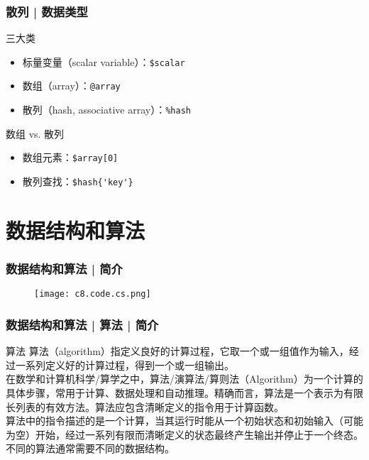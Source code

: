 \begin{frame}[fragile]
  \frametitle{散列 | \alert{数据类型}}
  \begin{block}{三大类}
    \begin{itemize}
      \item 标量变量（scalar variable）：\verb|$scalar|
      \item 数组（array）：\verb|@array|
      \item 散列（hash, associative array）：\verb|%hash|
    \end{itemize}
  \end{block}
  \pause
  \begin{block}{数组 vs. 散列}
    \begin{itemize}
      \item 数组元素：\verb|$array[0]|
      \item 散列查找：\verb|$hash{'key'}|
    \end{itemize}
  \end{block}
\end{frame}

\section{数据结构和算法}
\begin{frame}
  \frametitle{数据结构和算法 | 简介}
  \begin{figure}
    \centering
    \texttt{[image: c8.code.cs.png]}
  \end{figure}
\end{frame}

\begin{frame}
  \frametitle{数据结构和算法 | 算法 | 简介}
  \begin{block}{算法}
算法（algorithm）指定义良好的计算过程，它取一个或一组值作为输入，经过一系列定义好的计算过程，得到一个或一组输出。\\
    \vspace{0.5em}
    在数学和计算机科学/算学之中，算法/演算法/算则法（Algorithm）为一个计算的具体步骤，常用于计算、数据处理和自动推理。精确而言，算法是一个表示为有限长列表的有效方法。算法应包含清晰定义的指令用于计算函数。\\
    \vspace{0.5em}
算法中的指令描述的是一个计算，当其运行时能从一个初始状态和初始输入（可能为空）开始，经过一系列有限而清晰定义的状态最终产生输出并停止于一个终态。\\
    \vspace{0.5em}
    \alert{不同的算法通常需要不同的数据结构。}
  \end{block}
\end{frame}

